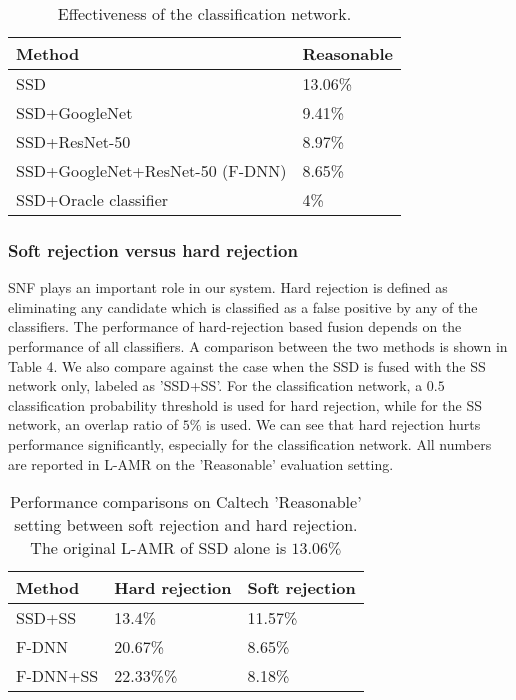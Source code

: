 \documentclass[10pt,letterpaper]{article}
\begin{document}
\begin{table}[h!]
\begin{center}
\begin{tabular}{|l|l|}
\hline
Method & Reasonable\\
\hline\hline
SSD & 13.06\%\\
SSD+GoogleNet & 9.41\%\\
SSD+ResNet-50 & 8.97\%\\
SSD+GoogleNet+ResNet-50 (F-DNN)& 8.65\%\\
SSD+Oracle classifier & 4\%\\
\hline
\end{tabular}
\end{center}
\caption{Effectiveness of the classification network.}
\end{table}


\subsubsection{Soft rejection versus hard rejection}
SNF plays an important role in our system. Hard rejection is defined as eliminating any candidate which is classified as a false positive by any of the classifiers. The performance of hard-rejection based fusion depends on the performance of all classifiers. A comparison between the two methods is shown in Table 4. We also compare against the case when the SSD is fused with the SS network only, labeled as 'SSD+SS'. For the classification network, a $0.5$ classification probability threshold is used for hard rejection, while for the SS network, an overlap ratio of $5\%$ is used. 
We can see that hard rejection hurts performance significantly, especially for the classification network. All numbers are reported in L-AMR on the 'Reasonable' evaluation setting.

\begin{table}[h!]
\begin{center}
\begin{tabular}{|l|l|l|}
\hline
Method & Hard rejection & Soft rejection\\
\hline\hline
SSD+SS & 13.4\% & 11.57\%\\
F-DNN & 20.67\% & 8.65\%\\
F-DNN+SS & 22.33\%\% & 8.18\%\\
\hline
\end{tabular}
\end{center}
\caption{Performance comparisons on Caltech 'Reasonable' setting between soft rejection and hard rejection. The original L-AMR of SSD alone is $13.06\%$}
\end{table}
\end{document}
